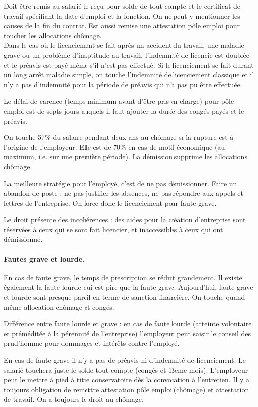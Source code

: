 Doit être remis au salarié le reçu pour solde de tout compte et le certificat de travail spécifiant la date d’emploi et la fonction.
On ne peut y mentionner les causes de la fin du contrat.
Est aussi remise une attestation pôle emploi pour toucher les allocations chômage.\\

Dans le cas où le licenciement se fait après un accident du travail, une maladie grave ou un problème d'inaptitude au travail, l'indemnité de licencie est doublée et le préavis est payé même s'il n'est pas effectué.
Si le licenciement se fait durant un long arrêt maladie simple, on touche l'indemnité de licenciement classique et il n'y a pas d'indemnité pour la période de préavis qui n'a pas pu être effectuée.

Le délai de carence (temps minimum avant d'être pris en charge) pour pôle emploi est de septs jours auquels il faut ajouter la durée des congés payés et le préavis.

On touche 57\% du salaire pendant deux ans au chômage si la rupture est à l’origine de l’employeur.
Elle est de 70\% en cas de motif économique (au maximum, i.e. sur une première période).
La démission supprime les allocations chômage.

La meilleure stratégie pour l’employé, c’est de ne pas démissionner.
Faire un abandon de poste : ne pas justifier les absences, ne pas répondre aux appels et lettres de l’entreprise.
On force donc le licenciement pour faute grave.

Le droit présente des incohérences : des aides pour la création d'entreprise sont réservées à ceux qui se sont fait licencier, et inaccessibles à ceux qui ont démissionné.


\paragraph{Fautes grave et lourde.}
En cas de faute grave, le temps de prescription se réduit grandement.
Il existe également la faute lourde qui est pire que la faute grave.
Aujourd’hui, faute grave et lourde sont presque pareil en terme de sanction financière.
On touche quand même allocation chômage et congés.

Différence entre faute lourde et grave : en cas de faute lourde (atteinte volontaire et préméditée à la pérennité de l'entreprise) l’employeur peut saisir le conseil des prud’homme pour dommages et intérêts contre l’employé.

En cas de faute grave il n'y a pas de préavis ni d’indemnité de licenciement. Le salarié touchera juste le solde tout compte (congés et 13eme mois).
L’employeur peut le mettre à pied à titre conservatoire dès la convocation à l’entretien.
Il y a toujours obligation de remettre attestation pôle emploi (chômage) et attestation de travail.
On a toujours le droit au chômage.


